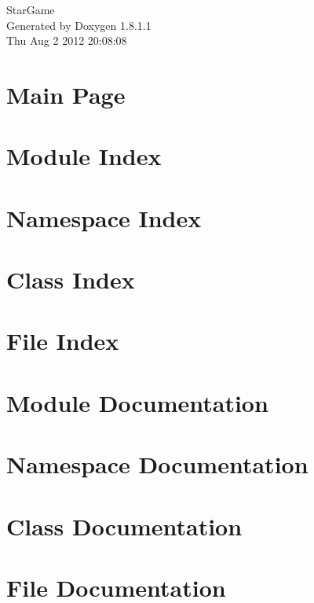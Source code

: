 \documentclass{book}
\begin{document}
\hypersetup{pageanchor=false,citecolor=blue}
\begin{titlepage}
\vspace*{7cm}
\begin{center}
{\Large Star\-Game }\\
\vspace*{1cm}
{\large Generated by Doxygen 1.8.1.1}\\
\vspace*{0.5cm}
{\small Thu Aug 2 2012 20:08:08}\\
\end{center}
\end{titlepage}
\clearemptydoublepage
{}
\tableofcontents
\clearemptydoublepage
{}
\hypersetup{pageanchor=true,citecolor=blue}
\chapter{Main Page}
\label{index}\hypertarget{index}{}
\chapter{Module Index}

\chapter{Namespace Index}

\chapter{Class Index}

\chapter{File Index}

\chapter{Module Documentation}


\chapter{Namespace Documentation}



\chapter{Class Documentation}















\chapter{File Documentation}








\printindex
\end{document}
